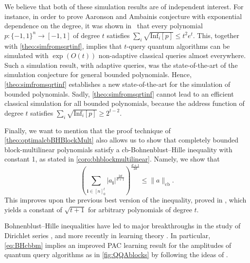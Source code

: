 \documentclass[11pt]{article}
\DeclareMathOperator{\cb}{cb}
\newcommand{\norm}[1]{\|#1\|}
\newcommand{\1}{\mathbf{1}}
\newcommand\Inf{\mathrm{Inf}}
\newcommand{\ind}[1]{\mathbf{#1}}
\theoremstyle{plain}
\theoremstyle{definition}
\theoremstyle{remark}
\begin{document}
We believe that both of these simulation results are of independent interest. For instance, in order to prove Aaronson and Ambainis conjecture with exponential dependence on the degree, it was shown in~\cite[Section 4]{defant2019fourier} that every polynomial $p:\{-1,1\}^n\to [-1,1]$ of degree $t$ satisfies $\sum_i\sqrt{\Inf_i[p]}\leq t^2e^t$. This, together with \cref{theo:simfromsqrtinf}, implies that $t$-query quantum algorithms can be simulated with $\exp(O(t))$ non-adaptive classical queries almost everywhere. Such a simulation result, with adaptive queries, was the state-of-the-art of the simulation conjecture for general bounded polynomials. Hence, \cref{theo:simfromsqrtinf} establishes a new state-of-the-art for the simulation of bounded polynomials. Sadly, \cref{theo:simfromsqrtinf} cannot lead to an efficient classical simulation for all bounded polynomials, because the address function of degree $t$ satisfies $\sum_i\sqrt{\Inf_i[p]}\geq 2^{t-2}.$


Finally, we want to mention that the proof technique of  \cref{theo:optimalcbBHBlockMult} also allows us to show that completely bounded block-multilinear polynomials satisfy a cb-Bohnenblust--Hille inequality with constant 1, as stated in \cref{coro:bhblockmultilinear}. Namely, we show that 
\begin{equation}\label{eq:BHcbbm}
    \left(\sum_{\ind i\in [n]_0^t}|a_{\ind i}|^{\frac{2d}{d+1}}\right)^{\frac{d+1}{2d}}\leq \norm{a}_{\cb}.
\end{equation}
This improves upon the previous best version of the inequality, proved in \cite{arunachalam2025cb}, which yields a constant of $\sqrt{t+1}$ for arbitrary polynomials of degree $t$.

Bohnenblust--Hille inequalities have led to major breakthroughs in the study of Dirichlet series \cite{bohnenblust1931absolute,defant2011bohnenblust}, and more recently in learning theory \cite{eskenazis2022learning,volberg2023noncommutative,slote2024bohnenblust}. In particular, \cref{eq:BHcbbm} implies an improved PAC learning result for the amplitudes of quantum query algorithms as in \cref{fig:QQAblocks} by following the ideas of \cite{arunachalam2025cb}.
\end{document}

